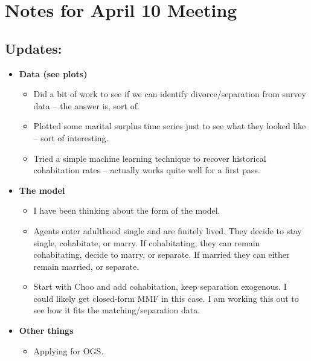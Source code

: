 \documentclass{article}
\begin{document}

\section*{Notes for April 10 Meeting}
\subsection*{Updates:}

\begin{itemize}
\item \textbf{Data (see plots)}
\begin{itemize}
\item Did a bit of work to see if we can identify divorce/separation from survey data -- the answer is, sort of.
\item Plotted some marital surplus time series just to see what they looked like -- sort of interesting.
\item Tried a simple machine learning technique to recover historical cohabitation rates -- actually works quite well for a first pass. 

\end{itemize}

\item \textbf{The model}
\begin{itemize}
\item I have been thinking about the form of the model.
\item Agents enter adulthood single and are finitely lived. They decide to stay single, cohabitate, or marry. If cohabitating, they can remain cohabitating, decide to marry, or separate. If married they can either remain married, or separate.
\item Start with Choo and add cohabitation, keep separation exogenous. I could likely get closed-form MMF in this case. I am working this out to see how it fits the matching/separation data.
\end{itemize}


\item \textbf{Other things}
\begin{itemize}
\item Applying for OGS.
\end{itemize}



\end{itemize}
\end{document}
